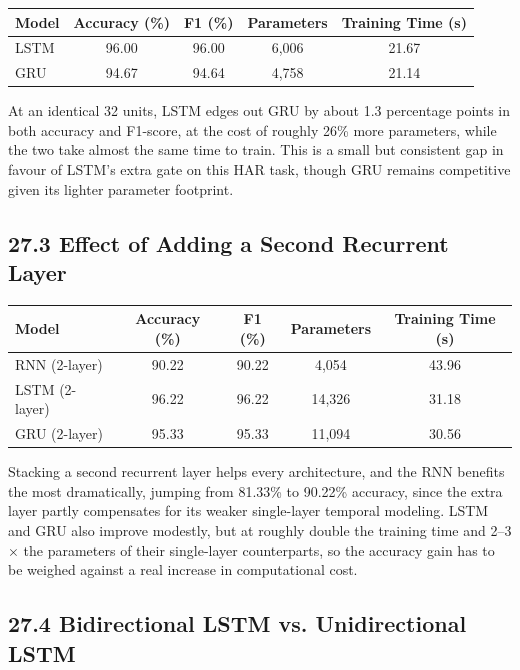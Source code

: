 \documentclass[10pt]{article}
\begin{document}
\begin{center}
\begin{tabular}{|l|c|c|c|c|}
\hline
Model & Accuracy (\%) & F1 (\%) & Parameters & Training Time (s)\\
\hline
LSTM & 96.00 & 96.00 & 6{,}006 & 21.67\\
GRU & 94.67 & 94.64 & 4{,}758 & 21.14\\
\hline
\end{tabular}
\end{center}

At an identical 32 units, LSTM edges out GRU by about 1.3 percentage points in both accuracy and F1-score, at the cost of roughly 26\% more parameters, while the two take almost the same time to train. This is a small but consistent gap in favour of LSTM's extra gate on this HAR task, though GRU remains competitive given its lighter parameter footprint.

\subsection*{27.3 Effect of Adding a Second Recurrent Layer}

\begin{center}
\begin{tabular}{|l|c|c|c|c|}
\hline
Model & Accuracy (\%) & F1 (\%) & Parameters & Training Time (s)\\
\hline
RNN (2-layer) & 90.22 & 90.22 & 4{,}054 & 43.96\\
LSTM (2-layer) & 96.22 & 96.22 & 14{,}326 & 31.18\\
GRU (2-layer) & 95.33 & 95.33 & 11{,}094 & 30.56\\
\hline
\end{tabular}
\end{center}

Stacking a second recurrent layer helps every architecture, and the RNN benefits the most dramatically, jumping from 81.33\% to 90.22\% accuracy, since the extra layer partly compensates for its weaker single-layer temporal modeling. LSTM and GRU also improve modestly, but at roughly double the training time and 2--3$\times$ the parameters of their single-layer counterparts, so the accuracy gain has to be weighed against a real increase in computational cost.

\subsection*{27.4 Bidirectional LSTM vs. Unidirectional LSTM}
\end{document}

